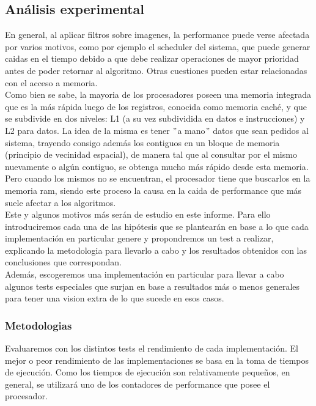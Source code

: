 \subsection{Análisis experimental}

En general, al aplicar filtros sobre imagenes, la performance puede verse afectada por varios motivos, como por ejemplo el scheduler del sistema, que puede generar caidas en el tiempo debido a que debe realizar operaciones de mayor prioridad antes de poder retornar al algoritmo. Otras cuestiones pueden estar relacionadas con el acceso a memoria.\\

Como bien se sabe, la mayoria de los procesadores poseen una memoria integrada que es la más rápida luego de los registros, conocida como memoria caché, y que se subdivide en dos niveles: L1 (a su vez subdividida en datos e instrucciones) y L2 para datos. 
La idea de la misma es tener $"$a mano$"$ datos que sean pedidos al sistema, trayendo consigo además los contiguos en un bloque de memoria (principio de vecinidad espacial), de manera tal que al consultar por el mismo nuevamente o algún contiguo, se obtenga mucho más rápido desde esta memoria. Pero cuando los mismos no se encuentran, el procesador tiene que buscarlos en la memoria ram, siendo este proceso la causa en la caida de performance que más suele afectar a los algoritmos.\\ 

Este y algunos motivos más serán de estudio en este informe. Para ello introduciremos cada una de las hipótesis que se plantearán en base a lo que cada implementación en particular genere y propondremos un test a realizar, explicando la metodologia para llevarlo a cabo y los resultados obtenidos con las conclusiones que correspondan.\\
 
Además, escogeremos una implementación en particular para llevar a cabo algunos tests especiales que surjan en base a resultados más o menos generales para tener una vision extra de lo que sucede en esos casos.\\

\subsubsection{Metodologias}

Evaluaremos con los distintos tests el rendimiento de cada implementación. El mejor o peor rendimiento de las implementaciones se basa en la toma de tiempos de ejecución. Como los tiempos de ejecución son relativamente pequeños, en general, se utilizará uno de los contadores de performance que posee el procesador. \\

